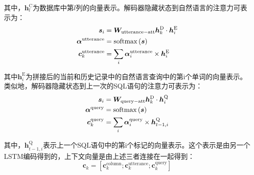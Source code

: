 其中，$\bm{h}_l^\mathrm{C}$为数据库中第$l$列的向量表示。解码器隐藏状态到自然语言的注意力可表示为：
\begin{align}
    \bm{s}_i&=\bm{W}_\mathrm{utterance-att}\bm{h}_k^\mathrm{D}\cdot\bm{h}_i^\mathrm{E}\\
    \bm{\alpha}^\mathrm{utterance}&=\mathrm{softmax}\left(\bm{s}\right)\\
    \bm{c}_k^\mathrm{utterance}&=\sum_{i}{\bm{\alpha}_i^\mathrm{utterance}\times\bm{h}_i^\mathrm{E}}
\end{align}

其中$\bm{h}_i^\mathrm{E}$为拼接后的当前和历史记录中的自然语言查询中的第i个单词的向量表示。类似地，解码器隐藏状态到上一次的SQL语句的注意力可表示为：
\begin{align}
    \bm{s}_i&=\bm{W}_\mathrm{query-att}\bm{h}_k^\mathrm{D}\cdot\bm{h}_i^\mathrm{Q}\\
    \bm{\alpha}^\mathrm{query}&=\mathrm{softmax}\left(\bm{s}\right)\\
    \bm{c}_k^\mathrm{query}&=\sum_{i}{\bm{\alpha}_i^\mathrm{query}\times\bm{h}_{t-1,i}^\mathrm{Q}}
\end{align}

其中，$\bm{h}_{t-1,i}^\mathrm{Q}$表示上一个SQL语句中的第i个标记的向量表示。这个表示是由另一个LSTM编码得到的，上下文向量是由上述三者连接在一起得到：
\begin{equation}
    \bm{c}_k=\left[\bm{c}_k^\mathrm{column};\bm{c}_k^\mathrm{utterance};\bm{c}_k^\mathrm{query}\right]
\end{equation}

